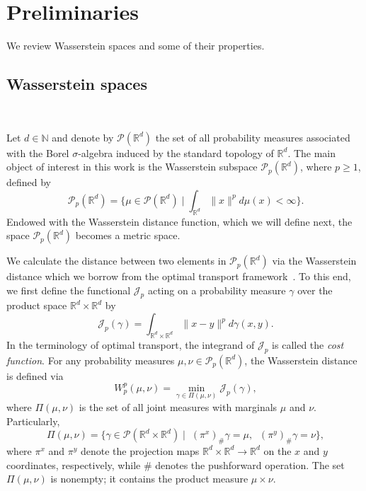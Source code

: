 \documentclass[12pt]{amsart}
\begin{document}

\newpage

\section{Preliminaries}\label{sec:preliminaries}

We review Wasserstein spaces and some of their properties.

\subsection{Wasserstein spaces}~\label{subsec:Wasserstein_intro}

Let $d\in\mathbb{N}$ and denote by $\mathcal{P}(\mathbb{R}^d)$ the set of all probability measures associated with the Borel $\sigma$-algebra induced by the standard topology of $\mathbb{R}^d$. The main object of interest in this work is the Wasserstein subspace $\mathcal{P}_p(\mathbb{R}^d)$, where $p\geq 1$, defined by
\begin{equation}~\label{eqn:wasserstein_space}
    \mathcal{P}_p(\mathbb{R}^d) = \bigg\{ \mu\in\mathcal{P}(\mathbb{R}^d) \; \big| \;\int_{\mathbb{R}^d}\|x\|^p d\mu(x) < \infty \bigg\}.
\end{equation}
Endowed with the Wasserstein distance function, which we will define next, the space $\mathcal{P}_p(\mathbb{R}^d)$ becomes a metric space.

We calculate the distance between two elements in $\mathcal{P}_p(\mathbb{R}^d)$ via the Wasserstein distance which we borrow from the optimal transport framework~\cite{santambrogio2015optimal}. To this end, we first define the functional $\mathcal{J}_p$ acting on a probability measure $\gamma$ over the product space $\mathbb{R}^d\times\mathbb{R}^d$ by
\begin{equation}~\label{eqn:wasserstein_functional}
    \mathcal{J}_p(\gamma) = \int_{\mathbb{R}^d\times \mathbb{R}^d}\|x-y\|^p d\gamma(x,y).
\end{equation}
In the terminology of optimal transport, the integrand of $\mathcal{J}_p$ is called the \emph{cost function}. For any probability measures $\mu,\nu\in\mathcal{P}_p(\mathbb{R}^d)$, the Wasserstein distance is defined via
\begin{equation}~\label{eqn:Wasserstein_distance}
    W_p^p(\mu, \nu) = \min_{\gamma\in\Pi(\mu, \nu)}\mathcal{J}_p(\gamma),
\end{equation}
where $\Pi(\mu,\nu)$ is the set of all joint measures with marginals $\mu$ and $\nu$. Particularly,
\begin{equation}~\label{eqn:joint_measures}
    \Pi(\mu,\nu)=\{\gamma\in\mathcal{P}(\mathbb{R}^d\times\mathbb{R}^d)\;|\;\; (\pi^x)_\#\gamma=\mu,\;\;(\pi^y)_\#\gamma=\nu\},
\end{equation}
where $\pi^x$ and $\pi^y$ denote the projection maps $\mathbb{R}^d\times\mathbb{R}^d\to\mathbb{R}^d$ on the $x$ and $y$ coordinates, respectively, while $\#$ denotes the pushforward operation. The set $\Pi(\mu,\nu)$ is nonempty; it contains the product measure $\mu\times\nu$.
\end{document}
